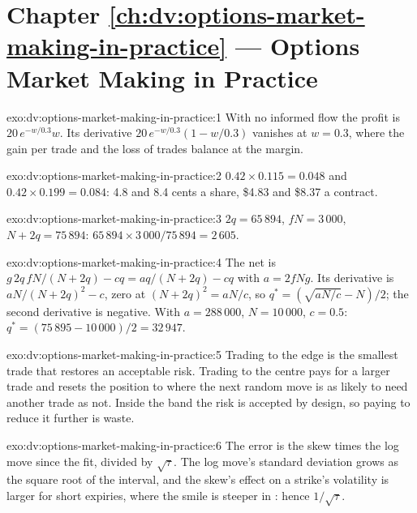 \section*{Chapter \ref{ch:dv:options-market-making-in-practice} --- Options Market Making in Practice}

\begin{solution}{exo:dv:options-market-making-in-practice:1}
With no informed flow the profit is $20\,e^{-w/0.3}w$. Its derivative $20\,e^{-w/0.3}(1-w/0.3)$ vanishes at $w=0.3$, where the gain per trade and the loss of
trades balance at the margin.
\end{solution}

\begin{solution}{exo:dv:options-market-making-in-practice:2}
$0.42\times0.115=0.048$ and $0.42\times0.199=0.084$: 4.8 and 8.4 cents a share, \$4.83 and \$8.37 a contract.
\end{solution}

\begin{solution}{exo:dv:options-market-making-in-practice:3}
$2q=65\,894$, $fN=3\,000$, $N+2q=75\,894$: $65\,894\times3\,000/75\,894=2\,605$.
\end{solution}

\begin{solution}{exo:dv:options-market-making-in-practice:4}
The net is $g\,2q\,fN/(N+2q)-cq=aq/(N+2q)-cq$ with $a=2fNg$. Its derivative is $aN/(N+2q)^2-c$, zero at $(N+2q)^2=aN/c$, so
$q^*=(\sqrt{aN/c}-N)/2$; the second derivative is negative. With $a=288\,000$, $N=10\,000$, $c=0.5$: $q^*=(75\,895-10\,000)/2=32\,947$.
\end{solution}

\begin{solution}{exo:dv:options-market-making-in-practice:5}
Trading to the edge is the smallest trade that restores an acceptable risk. Trading to the centre pays for a larger trade and resets the position to where the
next random move is as likely to need another trade as not. Inside the band the risk is accepted by design, so paying to reduce it further is waste.
\end{solution}

\begin{solution}{exo:dv:options-market-making-in-practice:6}
The error is the skew times the log move since the fit, divided by $\sqrt\tau$. The log move's standard deviation grows as the square root of the interval, and
the skew's effect on a strike's volatility is larger for short expiries, where the smile is steeper in : hence $1/\sqrt\tau$.
\end{solution}

